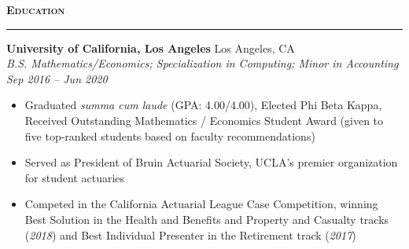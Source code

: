 \documentclass[11pt,letterpaper]{article}
\newcommand{\sectline}{\vspace{5pt}\hrule height 1.5pt\vspace{5pt}}
\newcommand{\sectspace}{\vspace{9pt}}
\newcommand{\smallspace}{\vspace{6pt}}
\newcommand{\heading}[1]{{\fontsize{12pt}{13pt} {\textbf{\textsc{#1}}}}}
\begin{document}
\sectspace

\heading{Education}\sectline
\textbf{University of California, Los Angeles} \hfill Los Angeles, CA \\
\textit{B.S. Mathematics/Economics; Specialization in Computing; Minor in Accounting} \hfill \textit{Sep 2016 -- Jun 2020}
\begin{itemize}
	\item Graduated \textit{summa cum laude} (GPA: 4.00/4.00), Elected Phi Beta Kappa, Received Outstanding Mathematics / Economics Student Award (given to five  top-ranked students based on faculty recommendations)
	\item Served as President of Bruin Actuarial Society, UCLA's premier organization for student actuaries 
	\item Competed in the California Actuarial League Case Competition, winning Best Solution in the Health and Benefits and Property and Casualty tracks (\textit{2018}) and Best Individual Presenter in the Retirement track (\textit{2017})
\end{itemize}
\sectspace

\end{document}

